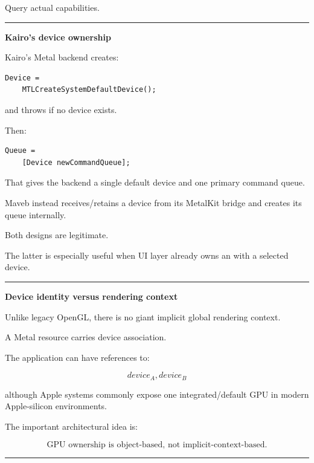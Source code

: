 Query actual capabilities.

\begin{center}\rule{0.5\linewidth}{0.5pt}\end{center}

\textbf{Kairo's device ownership}

Kairo's Metal backend creates:

\begin{verbatim}
Device =
    MTLCreateSystemDefaultDevice();
\end{verbatim}

and throws if no device exists.

Then:

\begin{verbatim}
Queue =
    [Device newCommandQueue];
\end{verbatim}

That gives the backend a single default device and one primary command queue.

Maveb instead receives/retains a device from its MetalKit bridge and creates its queue internally.

Both designs are legitimate.

The latter is especially useful when UI layer already owns an  with a selected device.

\begin{center}\rule{0.5\linewidth}{0.5pt}\end{center}

\textbf{Device identity versus rendering context}

Unlike legacy OpenGL, there is no giant implicit global rendering context.

A Metal resource carries device association.

The application can have references to:

\[
device_A,
device_B
\]

although Apple systems commonly expose one integrated/default GPU in modern Apple-silicon environments.

The important architectural idea is:

\[
\boxed{
\text{GPU ownership is object-based, not implicit-context-based}.
}
\]

\begin{center}\rule{0.5\linewidth}{0.5pt}\end{center}

\textbf{}

